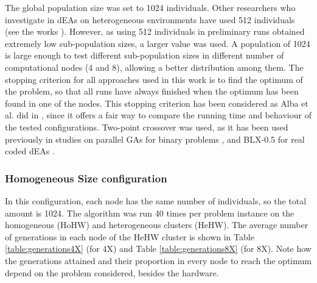 \documentclass[final,1p,times]{elsarticle}
\begin{document}
The global population size was set to 1024 individuals. Other researchers who investigate in dEAs on heterogeneous environments have used 512 individuals (see the works \cite{HYDROCM,Dominguez13HydroCM,Salto13Distributed}). However, as using 512 individuals in  preliminary runs obtained extremely low sub-population sizes, a larger value was used. A population of 1024 is large enough to test different sub-population sizes in different number of computational nodes (4 and 8), allowing a better distribution among them. The stopping criterion for all approaches used in this work is to find the optimum of the problem, so that all runs have always finished when the optimum has been found in one of the nodes. This stopping criterion has been considered as Alba et al. did in \cite{EVALUATIONPARALLEL}, since it offers a fair way to compare the running time and behaviour of the tested configurations. Two-point crossover was used, as it has been used previously in studies on parallel GAs  for binary problems \cite{CantuPazTopologies99}, and BLX-0.5 for real coded dEAs \cite{Robles09ParallelFuzzy}.

\subsubsection{Homogeneous Size configuration}



In this configuration, each node has the same number of individuals, so the total amount is 1024.  The algorithm was run 40 times per problem instance on the homogeneous (HoHW) and heterogeneous clusters (HeHW).  The average number of generations in each node of the HeHW cluster is shown in Table \ref{table:generations4X} (for 4X) and Table \ref{table:generations8X} (for 8X). Note how the generations attained and their proportion in every node to reach the optimum depend on the problem considered, besides the hardware.
\end{document}

